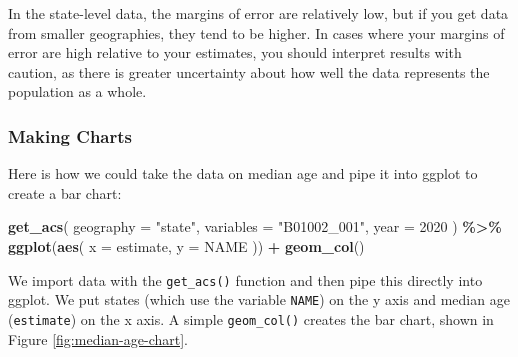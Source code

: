 \documentclass[
]{book}
\newenvironment{Shaded}{\begin{snugshade}}{\end{snugshade}}
\newcommand{\AttributeTok}[1]{\textcolor[rgb]{0.13,0.29,0.53}{#1}}
\newcommand{\DecValTok}[1]{\textcolor[rgb]{0.00,0.00,0.81}{#1}}
\newcommand{\FunctionTok}[1]{\textcolor[rgb]{0.13,0.29,0.53}{\textbf{#1}}}
\newcommand{\NormalTok}[1]{#1}
\newcommand{\SpecialCharTok}[1]{\textcolor[rgb]{0.81,0.36,0.00}{\textbf{#1}}}
\newcommand{\StringTok}[1]{\textcolor[rgb]{0.31,0.60,0.02}{#1}}
\begin{document}
In the state-level data, the margins of error are relatively low, but if you get data from smaller geographies, they tend to be higher. In cases where your margins of error are high relative to your estimates, you should interpret results with caution, as there is greater uncertainty about how well the data represents the population as a whole.

\hypertarget{making-charts}{%
\subsubsection*{Making Charts}\label{making-charts}}

Here is how we could take the data on median age and pipe it into ggplot to create a bar chart:

\begin{Shaded}
\begin{Highlighting}[]
\FunctionTok{get\_acs}\NormalTok{(}
  \AttributeTok{geography =} \StringTok{"state"}\NormalTok{,}
  \AttributeTok{variables =} \StringTok{"B01002\_001"}\NormalTok{,}
  \AttributeTok{year =} \DecValTok{2020}
\NormalTok{) }\SpecialCharTok{\%\textgreater{}\%}
  \FunctionTok{ggplot}\NormalTok{(}\FunctionTok{aes}\NormalTok{(}
    \AttributeTok{x =}\NormalTok{ estimate,}
    \AttributeTok{y =}\NormalTok{ NAME}
\NormalTok{  )) }\SpecialCharTok{+}
  \FunctionTok{geom\_col}\NormalTok{()}
\end{Highlighting}
\end{Shaded}

We import data with the \texttt{get\_acs()} function and then pipe this directly into ggplot. We put states (which use the variable \texttt{NAME}) on the y axis and median age (\texttt{estimate}) on the x axis. A simple \texttt{geom\_col()} creates the bar chart, shown in Figure \ref{fig:median-age-chart}.
\end{document}
